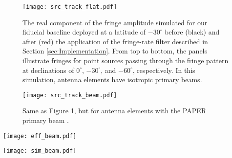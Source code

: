 \documentclass[twocolumn,apj,numberedappendix]{emulateapj}
\begin{document}
\begin{figure}\centering
\texttt{[image: src\_track\_flat.pdf]}
\caption{
The real component of the fringe amplitude simulated for our fiducial 
baseline deployed at a latitude of $-30^\circ$
before (black) and after (red) the application
of the fringe-rate filter described in Section \ref{sec:Implementation}.  From top to bottom,
the panels illustrate fringes
for point sources 
passing through the fringe pattern at declinations of $0^\circ$,
$-30^\circ$, and $-60^\circ$, respectively.  In this simulation,
antenna elements have isotropic primary beams.
}\label{fig:src_track_flat}
\end{figure}

\begin{figure}\centering
\texttt{[image: src\_track\_beam.pdf]}
\caption{
Same as Figure \ref{fig:src_track_flat}, but for antenna elements
with the PAPER primary beam \citep{parsons_et_al2010,pober_et_al2012}.
}\label{fig:src_track_beam}
\end{figure}

\begin{figure*}\centering
\texttt{[image: eff\_beam.pdf]}
\caption{
The effective primary beam response of a baseline, as reconstructed from point-source simulations 
described at the end of Section \ref{sec:PspecOptimization} and illustrated in Figures \ref{fig:src_track_flat} and
\ref{fig:src_track_beam}. 
The left panel shows that PAPER's model beam response is recovered from unfiltered
visibilities; the center panel illustrates the
beam weighting that results from applying a fringe-rate filter tuned to optimize sensitivity
for power spectrum measurements, assuming an isotropic primary beam; the right panel
shows the effective response after applying this fringe-rate filter to data including PAPER's model beam response.
The periodic structure along the vertical axis is an artifact of reconstructing beams from point sources 
spaced every $5^\circ$ in declination; we emphasize that they are not associated with any fundamental
structure associated with fringe-rate filtering.
}\label{fig:eff_beam}
\end{figure*}

\begin{figure*}\centering
\texttt{[image: sim\_beam.pdf]}
\caption{
The model primary beam response of a baseline, simulated analytically using the interpretation
of fringe-rate filtering as a spatial filter acting along fringe-rate contours.  Panels follow
the same order as in Figure \ref{fig:eff_beam}.
}\label{fig:sim_beam}
\end{figure*}
\end{document}
